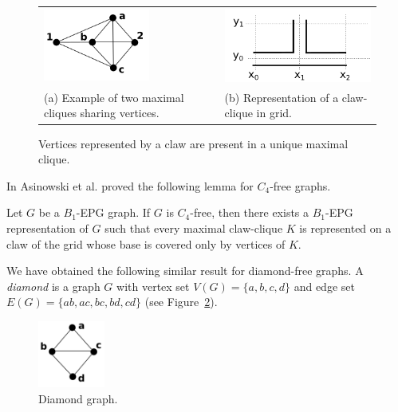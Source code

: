 \documentclass{dmgt}
\begin{document}
\begin{figure}[ht]
  \centering
  \begin{tabular}{  p{5cm} p{0.7cm} p{5cm} }
    \includegraphics[width=3.5cm]{lemaClaw2Maximais} & &
    \includegraphics[width=5.5cm]{claw2}
    \\
    \footnotesize %
    (a)  \footnotesize Example of two maximal cliques sharing vertices. && \footnotesize (b) Representation  of a claw-clique in grid.\\
  \end{tabular}

 \caption{Vertices represented by a claw are present in a unique maximal clique.} \label{fig:lemaClaw2Maximais}
\end{figure}


In \cite{ries2009} Asinowski et al. proved the following lemma for $C_4$-free graphs.

\begin{lemma} \cite{ries2009} \label{lem:lemaBRies2009}
Let $G$ be a $B_1$-EPG graph. If $G$ is $C_4$-free, then there exists a $B_1$-EPG representation of $G$ such that every  maximal claw-clique $K$ is represented on a claw of the grid whose base is covered only by vertices of $K$.
\end{lemma}


We have obtained the following similar result for diamond-free graphs. A \textit{diamond} is a graph $G$ with vertex set $V(G) = \{a, b, c, d\}$ and edge set $E(G)=\{ab, ac,bc, bd,cd\}$ (see Figure~\ref{fig:diamond}). %

%
 \begin{figure}[htb]	
 \center%
 \includegraphics[width=2.2cm]{diamond.png}
 \caption{Diamond graph.}
\label{fig:diamond}
\end{figure}  
 
\end{document}

